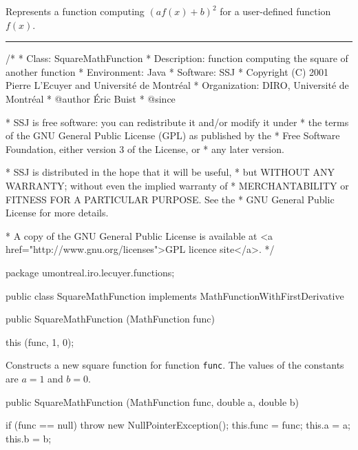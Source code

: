 
Represents a function computing
$(af(x) + b)^2$ for a user-defined function
$f(x)$.

\bigskip\hrule

\begin{code}
\begin{hide}
/*
 * Class:        SquareMathFunction
 * Description:  function computing the square of another function
 * Environment:  Java
 * Software:     SSJ 
 * Copyright (C) 2001  Pierre L'Ecuyer and Université de Montréal
 * Organization: DIRO, Université de Montréal
 * @author       Éric Buist
 * @since

 * SSJ is free software: you can redistribute it and/or modify it under
 * the terms of the GNU General Public License (GPL) as published by the
 * Free Software Foundation, either version 3 of the License, or
 * any later version.

 * SSJ is distributed in the hope that it will be useful,
 * but WITHOUT ANY WARRANTY; without even the implied warranty of
 * MERCHANTABILITY or FITNESS FOR A PARTICULAR PURPOSE.  See the
 * GNU General Public License for more details.

 * A copy of the GNU General Public License is available at
   <a href="http://www.gnu.org/licenses">GPL licence site</a>.
 */
\end{hide}
package umontreal.iro.lecuyer.functions;\begin{hide}

\end{hide}

public class SquareMathFunction implements MathFunctionWithFirstDerivative \begin{hide} {
   private MathFunction func;
   private double a, b;
\end{hide}

   public SquareMathFunction (MathFunction func)\begin{hide} {
      this (func, 1, 0);
   }\end{hide}
\end{code}
\begin{tabb}   Constructs a new square function
 for function \texttt{func}.
 The values of the constants are
 $a=1$ and $b=0$.
\end{tabb}
\begin{htmlonly}
\end{htmlonly}
\begin{code}

   public SquareMathFunction (MathFunction func, double a, double b)\begin{hide} {
      if (func == null)
         throw new NullPointerException();
      this.func = func;
      this.a = a;
      this.b = b;
   }\end{hide}
\end{code}
